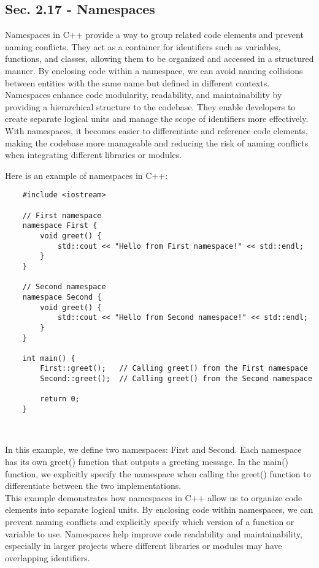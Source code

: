 \subsection*{Sec. 2.17 - Namespaces}

Namespaces in C++ provide a way to group related code elements and prevent naming conflicts. They act as a container for identifiers such as variables, functions, and classes, allowing them to be organized and accessed in a structured manner. By enclosing code within a namespace, we can avoid naming collisions between entities with 
the same name but defined in different contexts. Namespaces enhance code modularity, readability, and maintainability by providing a hierarchical structure to the codebase. They enable developers to create separate logical units and manage the scope of identifiers more effectively. With namespaces, it becomes easier to differentiate 
and reference code elements, making the codebase more manageable and reducing the risk of naming conflicts when integrating different libraries or modules. \\

\begin{solution}
    Here is an example of namespaces in C++: \\
    \horizontalline
    \begin{verbatim}
    #include <iostream>

    // First namespace
    namespace First {
        void greet() {
            std::cout << "Hello from First namespace!" << std::endl;
        }
    }
    
    // Second namespace
    namespace Second {
        void greet() {
            std::cout << "Hello from Second namespace!" << std::endl;
        }
    }
    
    int main() {
        First::greet();   // Calling greet() from the First namespace
        Second::greet();  // Calling greet() from the Second namespace
    
        return 0;
    }
    \end{verbatim} \\
    \horizontalline

    In this example, we define two namespaces: First and Second. Each namespace has its own greet() function that outputs a greeting message. In the main() function, we explicitly specify the namespace when calling the greet() function to differentiate between the two implementations. \\

    \noindent This example demonstrates how namespaces in C++ allow us to organize code elements into separate logical units. By enclosing code within namespaces, we can prevent naming conflicts and explicitly specify which version of a function or variable to use. Namespaces help improve code readability and maintainability, 
    especially in larger projects where different libraries or modules may have overlapping identifiers. \\
\end{solution}

